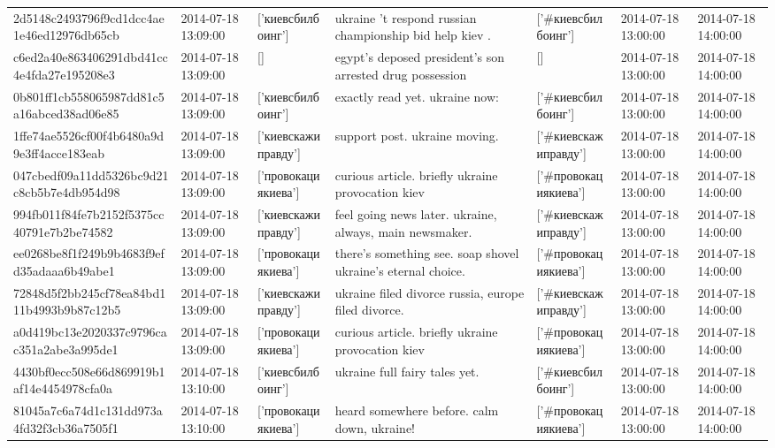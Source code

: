 \begin{tabular}{lllllll}
2d5148c2493796f9cd1dcc4ae1e46ed12976db65cb & 2014-07-18 13:09:00 & ['киевсбилбоинг'] & ukraine 't respond russian championship bid help kiev . & ['#киевсбилбоинг'] & 2014-07-18 13:00:00 & 2014-07-18 14:00:00 \\
c6ed2a40e863406291dbd41cc4e4fda27e195208e3 & 2014-07-18 13:09:00 & [] & egypt's deposed president's son arrested drug possession & [] & 2014-07-18 13:00:00 & 2014-07-18 14:00:00 \\
0b801ff1cb558065987dd81c5a16abced38ad06e85 & 2014-07-18 13:09:00 & ['киевсбилбоинг'] & exactly read yet. ukraine now: & ['#киевсбилбоинг'] & 2014-07-18 13:00:00 & 2014-07-18 14:00:00 \\
1ffe74ae5526cf00f4b6480a9d9e3ff4acce183eab & 2014-07-18 13:09:00 & ['киевскажиправду'] & support post. ukraine moving. & ['#киевскажиправду'] & 2014-07-18 13:00:00 & 2014-07-18 14:00:00 \\
047cbedf09a11dd5326bc9d21c8cb5b7e4db954d98 & 2014-07-18 13:09:00 & ['провокациякиева'] & curious article. briefly ukraine provocation kiev & ['#провокациякиева'] & 2014-07-18 13:00:00 & 2014-07-18 14:00:00 \\
994fb011f84fe7b2152f5375cc40791e7b2be74582 & 2014-07-18 13:09:00 & ['киевскажиправду'] & feel going news later. ukraine, always, main newsmaker. & ['#киевскажиправду'] & 2014-07-18 13:00:00 & 2014-07-18 14:00:00 \\
ee0268be8f1f249b9b4683f9efd35adaaa6b49abe1 & 2014-07-18 13:09:00 & ['провокациякиева'] & there's something see. soap shovel ukraine's eternal choice. & ['#провокациякиева'] & 2014-07-18 13:00:00 & 2014-07-18 14:00:00 \\
72848d5f2bb245cf78ea84bd111b4993b9b87c12b5 & 2014-07-18 13:09:00 & ['киевскажиправду'] & ukraine filed divorce russia, europe filed divorce. & ['#киевскажиправду'] & 2014-07-18 13:00:00 & 2014-07-18 14:00:00 \\
a0d419bc13e2020337c9796cac351a2abe3a995de1 & 2014-07-18 13:09:00 & ['провокациякиева'] & curious article. briefly ukraine provocation kiev & ['#провокациякиева'] & 2014-07-18 13:00:00 & 2014-07-18 14:00:00 \\
4430bf0ecc508e66d869919b1af14e4454978cfa0a & 2014-07-18 13:10:00 & ['киевсбилбоинг'] & ukraine full fairy tales yet. & ['#киевсбилбоинг'] & 2014-07-18 13:00:00 & 2014-07-18 14:00:00 \\
81045a7c6a74d1c131dd973a4fd32f3cb36a7505f1 & 2014-07-18 13:10:00 & ['провокациякиева'] & heard somewhere before. calm down, ukraine! & ['#провокациякиева'] & 2014-07-18 13:00:00 & 2014-07-18 14:00:00 \\

\end{tabular}
